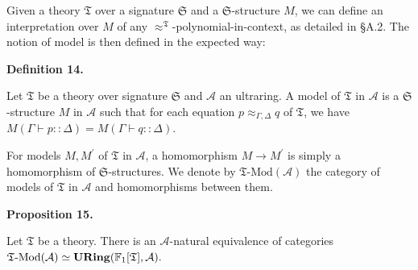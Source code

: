 \documentclass[10pt,a4paper]{amsart}
\begin{document}
 
 
 
Given a theory $\mathfrak{T}$ over a signature $\mathfrak{S}$ and a $\mathfrak{S}$-structure $M$, we can define an interpretation over $M$ of any $\approx^{\mathfrak{T}}$-polynomial-in-context, as detailed in §A.2. The notion of model is then defined in the expected way:\par
 
 
 
\par\medskip\noindent\textbf{Definition 14.}\par
 
 
Let $\mathfrak{T}$ be a theory over signature $\mathfrak{S}$ and $\mathcal{A}$ an ultraring. A model of $\mathfrak{T}$ in $\mathcal{A}$ is a $\mathfrak{S}$-structure $M$ in $\mathcal{A}$ such that for each equation $p\approx_{\Gamma,\Delta}q$ of $\mathfrak{T}$, we have $M(\Gamma\vdash p::\Delta)=M(\Gamma\vdash q::\Delta)$.\par
 
 
 
For models $M,M^{\prime}$ of $\mathfrak{T}$ in $\mathcal{A}$, a homomorphism $M\to M^{\prime}$ is simply a homomorphism of $\mathfrak{S}$-structures. We denote by $\mathfrak{T}\text{-}\mathrm{Mod}(\mathcal{A})$ the category of models of $\mathfrak{T}$ in $\mathcal{A}$ and homomorphisms between them.\par
 
 
 
 
\par\medskip\noindent\textbf{Proposition 15.}\par
 
 
Let $\mathfrak{T}$ be a theory. There is an $\mathcal{A}$-natural equivalence of categories $\mathfrak{T}\text{-}\mathrm{Mod}(\mathcal{A})\simeq\mathbf{URing}(\mathbb{F}_{%
1}[\mathfrak{T}],\mathcal{A}).$\par
 
 
\end{document}
